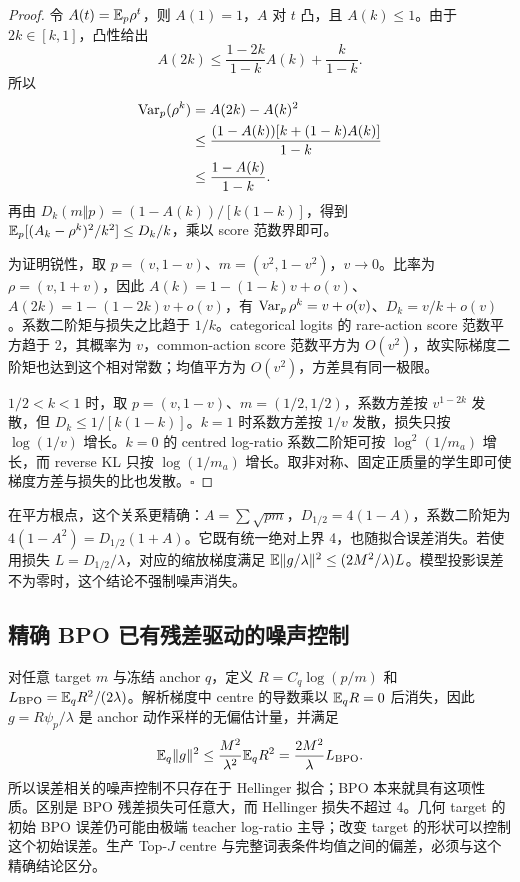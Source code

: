 \begin{proof}
令 $A(t)=\mathbb E_p\rho^t$，则 $A(1)=1$，$A$ 对 $t$ 凸，且 $A(k)\le1$。由于 $2k\in[k,1]$，凸性给出
\begin{equation}
 A(2k)\le\frac{1-2k}{1-k}A(k)+\frac{k}{1-k}.
\end{equation}
所以
\begin{align}
 \operatorname{Var}_p(\rho^k)&=A(2k)-A(k)^2\\
 &\le\frac{(1-A(k))[k+(1-k)A(k)]}{1-k}\\
 &\le\frac{1-A(k)}{1-k}.
\end{align}
再由 $D_k(m\Vert p)=(1-A(k))/[k(1-k)]$，得到 $\mathbb E_p[(A_k-\rho^k)^2/k^2]\le D_k/k$，乘以 score 范数界即可。

为证明锐性，取 $p=(v,1-v)$、$m=(v^2,1-v^2)$，$v\to0$。比率为 $\rho=(v,1+v)$，因此 $A(k)=1-(1-k)v+o(v)$、$A(2k)=1-(1-2k)v+o(v)$，有 $\operatorname{Var}_p\rho^k=v+o(v)$、$D_k=v/k+o(v)$。系数二阶矩与损失之比趋于 $1/k$。categorical logits 的 rare-action score 范数平方趋于 2，其概率为 $v$，common-action score 范数平方为 $O(v^2)$，故实际梯度二阶矩也达到这个相对常数；均值平方为 $O(v^2)$，方差具有同一极限。

$1/2<k<1$ 时，取 $p=(v,1-v)$、$m=(1/2,1/2)$，系数方差按 $v^{1-2k}$ 发散，但 $D_k\le1/[k(1-k)]$。$k=1$ 时系数方差按 $1/v$ 发散，损失只按 $\log(1/v)$ 增长。$k=0$ 的 centred log-ratio 系数二阶矩可按 $\log^2(1/m_a)$ 增长，而 reverse KL 只按 $\log(1/m_a)$ 增长。取非对称、固定正质量的学生即可使梯度方差与损失的比也发散。\hfill$\square$
\end{proof}

在平方根点，这个关系更精确：$A=\sum\sqrt{pm}$，$D_{1/2}=4(1-A)$，系数二阶矩为 $4(1-A^2)=D_{1/2}(1+A)$。它既有统一绝对上界 4，也随拟合误差消失。若使用损失 $L=D_{1/2}/\lambda$，对应的缩放梯度满足 $\mathbb E\|g/\lambda\|^2\le(2M^2/\lambda)L$。模型投影误差不为零时，这个结论不强制噪声消失。

\subsection{精确 BPO 已有残差驱动的噪声控制}

对任意 target $m$ 与冻结 anchor $q$，定义 $R=C_q\log(p/m)$ 和 $L_{\mathrm{BPO}}=\mathbb E_qR^2/(2\lambda)$。解析梯度中 centre 的导数乘以 $\mathbb E_qR=0$ 后消失，因此 $g=R\psi_p/\lambda$ 是 anchor 动作采样的无偏估计量，并满足
\begin{equation}
 \mathbb E_q\|g\|^2\le\frac{M^2}{\lambda^2}\mathbb E_qR^2
 =\frac{2M^2}{\lambda}L_{\mathrm{BPO}}.
\end{equation}
所以误差相关的噪声控制不只存在于 Hellinger 拟合；BPO 本来就具有这项性质。区别是 BPO 残差损失可任意大，而 Hellinger 损失不超过 4。几何 target 的初始 BPO 误差仍可能由极端 teacher log-ratio 主导；改变 target 的形状可以控制这个初始误差。生产 Top-$J$ centre 与完整词表条件均值之间的偏差，必须与这个精确结论区分。

